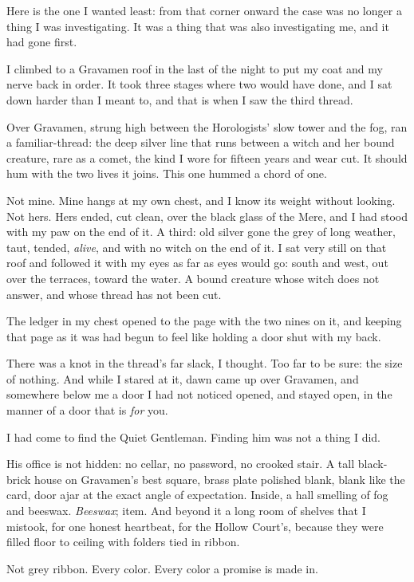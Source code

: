 Here is the one I wanted least: from that corner onward the case was no longer a thing I was investigating. It was a thing that was also investigating me, and it had gone first.

I climbed to a Gravamen roof in the last of the night to put my coat and my nerve back in order. It took three stages where two would have done, and I sat down harder than I meant to, and that is when I saw the third thread.

Over Gravamen, strung high between the Horologists' slow tower and the fog, ran a familiar-thread: the deep silver line that runs between a witch and her bound creature, rare as a comet, the kind I wore for fifteen years and wear cut. It should hum with the two lives it joins. This one hummed a chord of one.

Not mine. Mine hangs at my own chest, and I know its weight without looking. Not hers. Hers ended, cut clean, over the black glass of the Mere, and I had stood with my paw on the end of it. A third: old silver gone the grey of long weather, taut, tended, \emph{alive}, and with no witch on the end of it. I sat very still on that roof and followed it with my eyes as far as eyes would go: south and west, out over the terraces, toward the water. A bound creature whose witch does not answer, and whose thread has not been cut.

The ledger in my chest opened to the page with the two nines on it, and keeping that page as it was had begun to feel like holding a door shut with my back.

There was a knot in the thread's far slack, I thought. Too far to be sure: the size of nothing. And while I stared at it, dawn came up over Gravamen, and somewhere below me a door I had not noticed opened, and stayed open, in the manner of a door that is \emph{for} you.

I had come to find the Quiet Gentleman. Finding him was not a thing I did.

\scenebreak

His office is not hidden: no cellar, no password, no crooked stair. A tall black-brick house on Gravamen's best square, brass plate polished blank, blank like the card, door ajar at the exact angle of expectation. Inside, a hall smelling of fog and beeswax. \emph{Beeswax}; item. And beyond it a long room of shelves that I mistook, for one honest heartbeat, for the Hollow Court's, because they were filled floor to ceiling with folders tied in ribbon.

Not grey ribbon. Every color. Every color a promise is made in.

